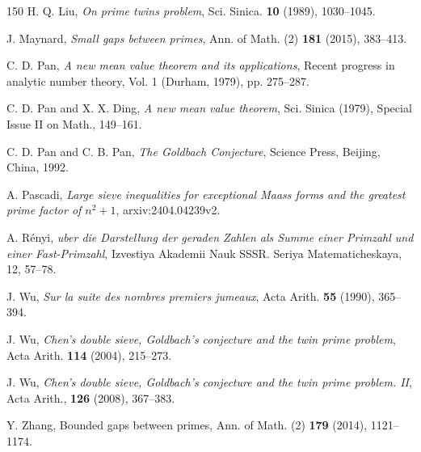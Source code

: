 \documentclass[12pt, a4paper]{amsart}
\theoremstyle{plain}
\theoremstyle{remark}
\numberwithin{equation}{section}
\begin{document}
\begin{thebibliography}{150}
 H. Q. Liu, \emph{On prime twins problem}, Sci. Sinica. {\bf 10} (1989), 1030--1045.
		
J. Maynard,
\emph{Small gaps between primes},
Ann. of Math. (2) {\bf 181} (2015), 383--413.
		
C. D. Pan,  
\emph{A new mean value theorem and its applications},
Recent progress in analytic number theory, Vol. 1 (Durham, 1979), pp. 275--287. 

 C. D. Pan and X. X. Ding, 
\emph{A new mean value theorem}, Sci. Sinica (1979), 
Special Issue II on Math., 149--161.
		
 C. D. Pan and C. B. Pan, 
\emph{The Goldbach Conjecture}, Science Press, Beijing, China, 1992. 
		
A. Pascadi,
\emph{Large sieve inequalities for exceptional Maass forms and the greatest prime factor of $n^2+1$},
arxiv:2404.04239v2.
		
 A. R\'enyi, \emph{uber die Darstellung der geraden Zahlen als Summe einer Primzahl und einer Fast-Primzahl}, Izvestiya Akademii Nauk SSSR. Seriya Matematicheskaya, 12, 57--78.
		
 J. Wu, 
\emph{Sur la suite des nombres premiers jumeaux}, Acta Arith. {\bf 55} (1990), 365--394.
		
J. Wu,
\emph{Chen's double sieve, Goldbach's conjecture and the twin prime problem},
Acta Arith. {\bf 114} (2004), 215--273.
		
J. Wu,
\emph{Chen's double sieve, Goldbach's conjecture and the twin prime problem. II}, 
Acta Arith., {\bf 126} (2008), 367--383.
		
Y. Zhang,
Bounded gaps between primes, Ann. of Math. (2) {\bf 179} (2014), 1121--1174.
\end{thebibliography} 
\end{document}
